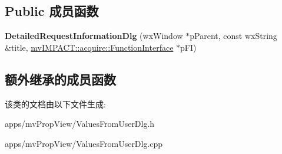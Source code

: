 \subsection*{Public 成员函数}
\begin{DoxyCompactItemize}
\item 
\hypertarget{class_detailed_request_information_dlg_ae26d7e4bdf3f8ef7fb7103f591c5b5ed}{{\bfseries Detailed\+Request\+Information\+Dlg} (wx\+Window $\ast$p\+Parent, const wx\+String \&title, \hyperlink{classmv_i_m_p_a_c_t_1_1acquire_1_1_function_interface}{mv\+I\+M\+P\+A\+C\+T\+::acquire\+::\+Function\+Interface} $\ast$p\+F\+I)}\label{class_detailed_request_information_dlg_ae26d7e4bdf3f8ef7fb7103f591c5b5ed}

\end{DoxyCompactItemize}
\subsection*{额外继承的成员函数}


该类的文档由以下文件生成\+:\begin{DoxyCompactItemize}
\item 
apps/mv\+Prop\+View/Values\+From\+User\+Dlg.\+h\item 
apps/mv\+Prop\+View/Values\+From\+User\+Dlg.\+cpp\end{DoxyCompactItemize}
